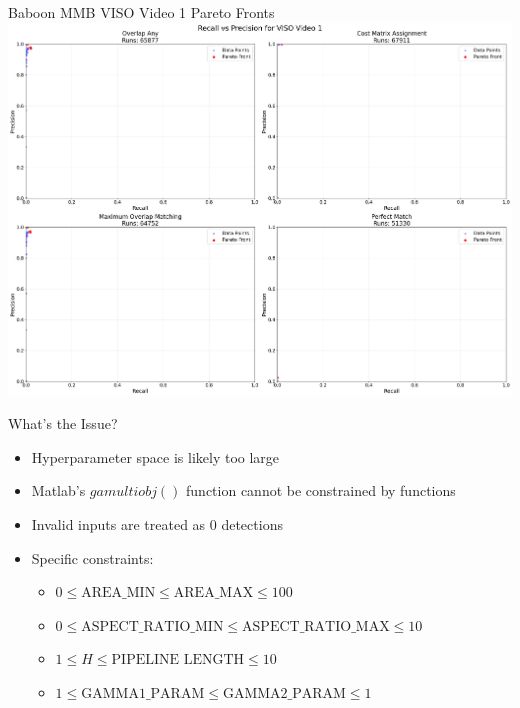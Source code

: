 \begin{frame}{Baboon MMB VISO Video 1 Pareto Fronts}
    \centering
    \includegraphics[width=1\textwidth,height=0.85\textheight,keepaspectratio]{images/bom/d5f18f73-3f1c-4386-8efa-9f25a41693f0.png}
\end{frame}

\begin{frame}{What's the Issue?}
    \begin{itemize}
        \item Hyperparameter space is likely too large
        \item Matlab's $gamultiobj()$ function cannot be constrained by functions
        \item Invalid inputs are treated as 0 detections
        \item Specific constraints:
              \begin{itemize}
                  \item $0 \leq \text{AREA\_MIN} \leq \text{AREA\_MAX} \leq 100$
                  \item $0 \leq \text{ASPECT\_RATIO\_MIN} \leq \text{ASPECT\_RATIO\_MAX} \leq 10$
                  \item $1 \leq H \leq \text{PIPELINE LENGTH} \leq 10$
                  \item $1 \leq \text{GAMMA1\_PARAM} \leq \text{GAMMA2\_PARAM} \leq 1$
              \end{itemize}
    \end{itemize}
\end{frame}

